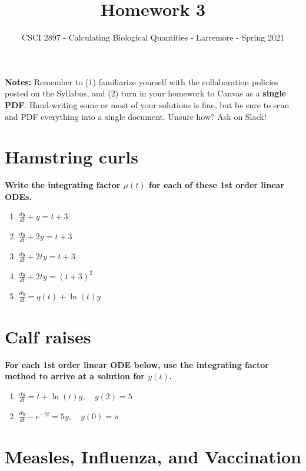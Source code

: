 \documentclass[11pt,onecolumn,superscriptaddress,notitlepage]{article}
\date{}
\newcommand{\dy}[0]{\displaystyle\frac{dy}{dt}}
\begin{document}
\author{CSCI 2897 - Calculating Biological Quantities - Larremore - Spring 2021}
\title{Homework 3}
\maketitle

{\bf Notes:} Remember to (1) familiarize yourself with the collaboration policies posted on the Syllabus, and (2) turn in your homework to Canvas as a {\bf single PDF}. Hand-writing some or most of your solutions is fine, but be sure to scan and PDF everything into a single document. Unsure how? Ask on Slack! 

\section*{Hamstring curls}

{\bf Write the integrating factor $\mu(t)$ for each of these 1st order linear ODEs.} 

\begin{enumerate}
	\item $\dy + y = t+3$
	\item $\dy + 2y = t+3$
	\item $\dy + 2ty = t+3$
	\item $\dy + 2ty = (t+3)^2$
	\item $\dy = q(t) + \ln(t)y$
\end{enumerate}

\section*{Calf raises} 

{\bf For each 1st order linear ODE below, use the integrating factor method to arrive at a solution for $y(t)$.}

\begin{enumerate}[resume]
	\item $\dy = t + \ln(t)y, \quad y(2) = 5$
	\item $\dy - e^{-2t} = 5y, \quad y(0) = \pi$
\end{enumerate}

\clearpage
\section*{Measles, Influenza, and Vaccination} 
\end{document}
